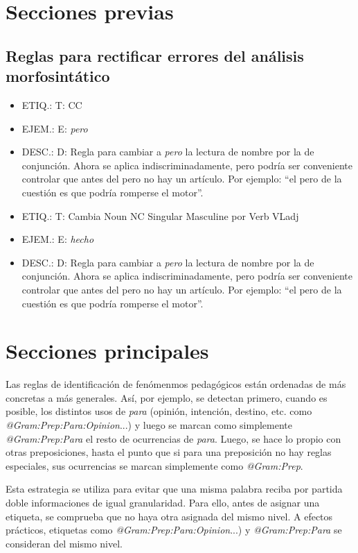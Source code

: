 \documentclass[11pt]{report}
\begin{document}
\part{Secciones previas}
\chapter{Reglas para rectificar errores del análisis morfosintático}
\begin{itemize}
\item ETIQ.:  T: CC
\item EJEM.:  E: \emph{pero} 
\item DESC.:  D: Regla para cambiar a \emph{pero} la lectura de nombre por la de conjunción. Ahora se aplica indiscriminadamente, pero podría ser conveniente controlar que antes del pero no hay un artículo. Por ejemplo: ``el pero de la cuestión es que podría romperse el motor''.
\end{itemize}

\begin{itemize}
\item ETIQ.:  T: Cambia Noun NC Singular Masculine por Verb VLadj
\item EJEM.:  E: \emph{hecho} 
\item DESC.:  D: Regla para cambiar a \emph{pero} la lectura de nombre por la de conjunción. Ahora se aplica indiscriminadamente, pero podría ser conveniente controlar que antes del pero no hay un artículo. Por ejemplo: ``el pero de la cuestión es que podría romperse el motor''.
\end{itemize}

\part{Secciones principales}
Las reglas de identificación de fenómenmos pedagógicos están ordenadas de más concretas a más generales. Así, por ejemplo, se detectan primero, cuando es posible, los distintos usos de \emph{para} (opinión, intención, destino, etc. como \emph{@Gram:Prep:Para:Opinion}...) y luego se marcan como simplemente \emph{@Gram:Prep:Para} el resto de ocurrencias de \emph{para}. Luego, se hace lo propio con otras preposiciones, hasta el punto que si para una preposición no hay reglas especiales, sus ocurrencias se marcan simplemente como \emph{@Gram:Prep}.

Esta estrategia se utiliza para evitar que una misma palabra reciba por partida doble informaciones de igual granularidad. Para ello, antes de asignar una etiqueta, se comprueba que no haya otra asignada del mismo nivel. A efectos prácticos, etiquetas como \emph{@Gram:Prep:Para:Opinion}...) y \emph{@Gram:Prep:Para} se consideran del mismo nivel.
\end{document}
